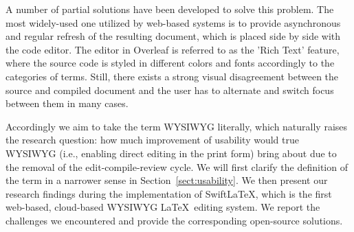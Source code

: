 \documentclass[sigconf]{acmart}
\begin{document}

A number of partial solutions have been developed to solve this problem. The most widely-used one utilized by web-based systems is to provide asynchronous and regular refresh of the resulting document, which is placed side by side with the code editor. 
The editor in Overleaf is referred to as the 'Rich Text' feature, where the source code is styled in different colors and fonts accordingly to the categories of terms. 
Still, there exists a strong visual disagreement between the source and compiled document and the user has to alternate and switch focus between them in many cases.

Accordingly we aim to take the term WYSIWYG literally, which naturally raises the research question: how much improvement of usability would true WYSIWYG (i.e., enabling direct editing in the print form) bring about due to the removal of the edit-compile-review cycle. 
We will first clarify the definition of the term in a narrower sense in Section~\ref{sect:usability}.
We then present our research findings during the implementation of SwiftLaTeX, which is the first web-based, cloud-based WYSIWYG \LaTeX\ editing system. 
We report the  challenges we encountered and provide the corresponding open-source solutions.





\end{document}
